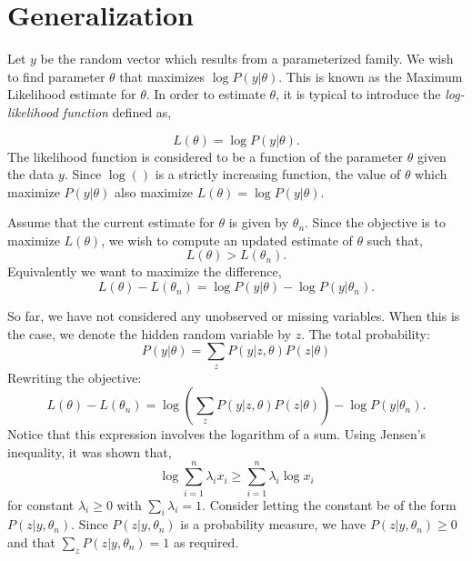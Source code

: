 \documentclass{article}  %
\begin{document}
\section{Generalization}

Let $y$ be the random vector which results from a parameterized family. We wish to find parameter $\theta$ that maximizes $\log P(y|\theta)$. This is known as the Maximum Likelihood estimate for $\theta$. In order to estimate $\theta$, it is typical to introduce the \emph{log-likelihood function} defined as,

\[
L(\theta)=\log P(y|\theta).
\]
The likelihood function is considered to be a function of the parameter $\theta$ given the data $y$.  Since $\log()$ is a strictly increasing function, the value of $\theta$ which maximize $P(y|\theta)$ also maximize $L(\theta)=\log P(y|\theta)$. 

Assume that the current estimate for $\theta$ is given by $\theta_n$. Since the objective is to maximize $L(\theta)$, we wish to compute an updated estimate of $\theta$ such that,
\[
L(\theta) > L(\theta_n).
\]
Equivalently we want to maximize the difference,
\[
L(\theta)-L(\theta_n) = \log P(y|\theta) - \log P(y|\theta_n).
\]

So far, we have not considered any unobserved or missing variables. When this is the case, we denote the hidden random variable by $z$. The total probability:
\[
P(y|\theta) = \sum_z P(y|z, \theta) P(z|\theta)
\]
Rewriting the objective:
\[
L(\theta)-L(\theta_n) = \log \left( \sum_z P(y|z, \theta) P(z|\theta)\right) - \log P(y|\theta_n).
\]
Notice that this expression involves the logarithm of a sum. Using Jensen's inequality, it was shown that,
\[
\log \sum_{i=1}^n \lambda_i x_i \geq \sum_{i=1}^n \lambda_i \log x_i
\]
for constant $\lambda_i \geq 0$ with $\sum_i \lambda_i = 1$.  Consider letting the constant be of the form $P(z|y, \theta_n)$. Since $P(z|y, \theta_n)$ is a probability measure, we have $P(z|y, \theta_n) \geq 0$ and that $\sum_z P(z|y, \theta_n) = 1$ as required.
\end{document}
